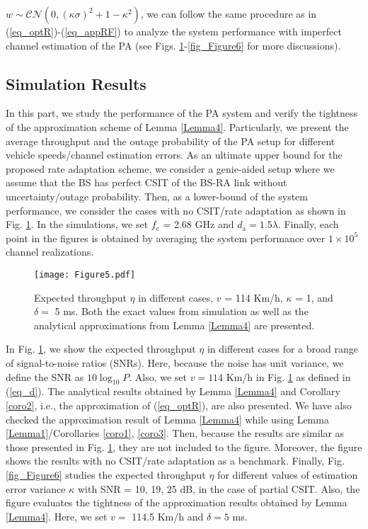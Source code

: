 $w \sim\mathcal{CN}\left(0,(\kappa\sigma)^2+1-\kappa^2\right)$, we can follow the same procedure as in (\ref{eq_optR})-(\ref{eq_appRF}) to analyze the system performance with imperfect channel estimation of the PA (see Figs. \ref{fig_Figure5}-\ref{fig_Figure6} for more discussions).

\subsection{Simulation Results}
In this part, we study the performance of the PA system and verify the tightness of the approximation scheme of Lemma \ref{Lemma4}. Particularly, we present the average throughput and the outage probability of the PA setup for different vehicle speeds/channel estimation errors. As an ultimate upper bound for the proposed rate adaptation scheme, we consider a genie-aided setup where we assume that the BS has perfect CSIT of the BS-RA link without uncertainty/outage probability. Then, as a lower-bound of the system performance, we consider the cases with no CSIT/rate adaptation as shown in Fig. \ref{fig_Figure5}. In the simulations, we set  $f_\text{c}$ = 2.68 GHz and $d_\text{a} = 1.5\lambda$. Finally, each point in the figures is obtained by averaging the system performance over $1\times10^5$ channel realizations.

\begin{figure}
\centering
  \texttt{[image: Figure5.pdf]}\\
\caption{Expected throughput $\eta$ in different cases, $v$ = 114 Km/h, $\kappa$ = 1, and $\delta = $ 5 ms. Both the exact values from simulation as well as the analytical approximations from Lemma \ref{Lemma4} are presented.}\label{fig_Figure5}
\end{figure}


In Fig. \ref{fig_Figure5}, we show the expected throughput $\eta$  in different cases for a broad range of signal-to-noise ratios (SNRs). Here, because the noise has unit variance, we define the SNR as $10\log_{10}P$. Also, we set $v = 114$ Km/h in Fig. \ref{fig_Figure5}  as defined in (\ref{eq_d}). The analytical results obtained by Lemma \ref{Lemma4} and Corollary \ref{coro2}, i.e., the approximation of (\ref{eq_optR}), are also presented. We have also checked the approximation result of Lemma \ref{Lemma4} while using Lemma \ref{Lemma1}/Corollaries \ref{coro1}, \ref{coro3}. Then, because the results are similar as those presented in Fig. \ref{fig_Figure5}, they are not included to the figure. Moreover, the figure shows the results with no CSIT/rate adaptation as a benchmark. Finally, Fig. \ref{fig_Figure6} studies the expected throughput $\eta$ for different values of estimation error variance $\kappa$ with SNR = 10, 19, 25 dB, in the case of partial CSIT. Also, the figure evaluates the tightness of the approximation results obtained by Lemma \ref{Lemma4}. Here,  we set $v =$ 114.5 Km/h and $\delta = 5$ ms.

